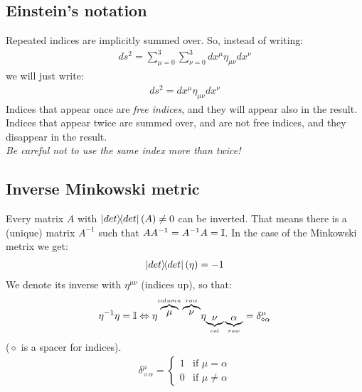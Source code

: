 \documentclass[../template.tex]{subfiles}
\begin{document}
\subsection{Einstein's notation}
Repeated indices are implicitly summed over. So, instead of writing:
\begin{align*}
ds^2 =\sum_{\mu=0}^3 \sum_{\nu=0}^3 dx^\mu \eta_{\mu\nu}dx^\nu
\end{align*}
we will just write:
\begin{align*}
ds^2 = dx^\mu \eta_{\mu\nu}dx^\nu
\end{align*}
Indices that appear once are \textit{free indices}, and they will appear also in the result.\\
Indices that appear twice are summed over, and are not free indices, and they disappear in the result.\\
\textit{Be careful not to use the same index more than twice!}

\subsection{Inverse Minkowski metric}
Every matrix $A$ with $\op{det}(A) \neq 0$ can be inverted. That means there is a (unique) matrix $A^{-1}$ such that $AA^{-1}=A^{-1}A = \mathbb{I}$. In the case of the Minkowski metrix we get:
\begin{align*}
\op{det}(\eta) = -1
\end{align*}
We denote its inverse with $\eta^{\mu\nu}$ (indices up), so that:
\begin{align*}
\eta^{-1}\eta = \mathbb{I} \Leftrightarrow \eta^{\overbrace{\mu}^{ column}\overbrace{\nu}^{row}}\eta_{\underbrace{\nu}_{col}\underbrace{\alpha}_{row}} = \delta^{\mu}_{\diamond\alpha}
\end{align*}
($\diamond$ is a spacer for indices).\\
\begin{align*}
\delta^{\mu}_{\diamond \alpha} = \begin{cases}
1 & \text{if $\mu=\alpha$}\\
0 & \text{if $\mu \neq \alpha$}
\end{cases}
\end{align*}
\end{document}
